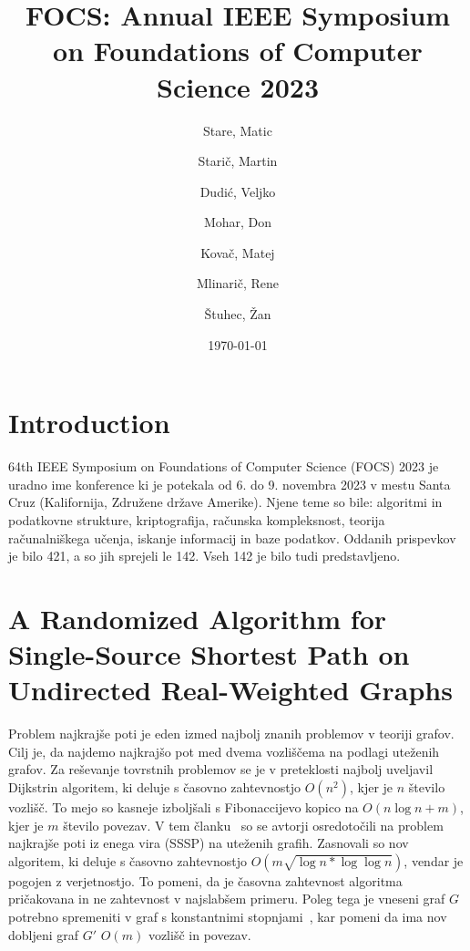\documentclass{article}
\title{FOCS: Annual IEEE Symposium on Foundations of Computer Science 2023}
\author{
  Stare, Matic\\
  \and
  Starič, Martin\\
  \and
  Dudić, Veljko\\
  \and
  Mohar, Don
  \and
  Kovač, Matej
  \and
  Mlinarič, Rene
  \and
  Štuhec, Žan
}
\date{\today}
\begin{document}
\maketitle

\tableofcontents
\newpage

\section{Introduction}
64th IEEE Symposium on Foundations of Computer Science (FOCS) 2023 je uradno ime konference ki je potekala od 6. do 9. novembra 2023 v mestu Santa Cruz (Kalifornija, Združene države Amerike). Njene teme so bile: algoritmi in podatkovne strukture, kriptografija, računska kompleksnost, teorija računalniškega učenja, iskanje informacij in baze podatkov. Oddanih prispevkov je bilo 421, a so jih sprejeli le 142. Vseh 142 je bilo tudi predstavljeno.

\section{A Randomized Algorithm for Single-Source Shortest Path on Undirected Real-Weighted Graphs}

Problem najkrajše poti je eden izmed najbolj znanih problemov v teoriji grafov. Cilj je, da najdemo najkrajšo pot med dvema vozliščema na podlagi uteženih grafov. Za reševanje tovrstnih problemov se je v preteklosti najbolj uveljavil Dijkstrin algoritem, ki deluje s časovno zahtevnostjo $O(n^2)$, kjer je $n$ število vozlišč. To mejo so kasneje izboljšali s Fibonaccijevo kopico na $O(n \log n + m)$, kjer je $m$ število povezav. V tem članku~\cite{duan2023randomized} so se avtorji osredotočili na problem najkrajše poti iz enega vira (SSSP) na uteženih grafih. Zasnovali so nov algoritem, ki deluje s časovno zahtevnostjo $O(m \sqrt{\log n * \log \log n})$, vendar je pogojen z verjetnostjo. To pomeni, da je časovna zahtevnost algoritma pričakovana in ne zahtevnost v najslabšem primeru. Poleg tega je vneseni graf $G$ potrebno spremeniti v graf s konstantnimi stopnjami~\cite{frederickson1983data}, kar pomeni da ima nov dobljeni graf $G'$ $O(m)$ vozlišč in povezav.
\end{document}
